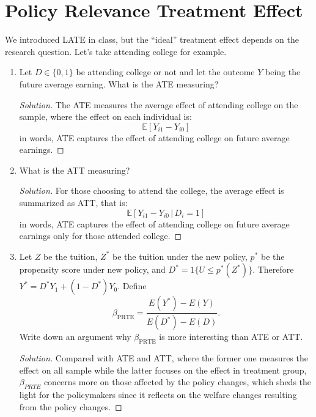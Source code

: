 \documentclass[11pt]{article}
\newenvironment{solution}{%
  \renewcommand\qedsymbol{$\blacksquare$}%
  \begin{mdframed}[backgroundcolor=gray!15]%
  \begin{proof}[Solution]}%
  {\end{proof}%
  \end{mdframed}}%
\newcommand{\ept}{\mathbb{E}}
\newcommand{\given}{\,|\,}
\begin{document}
    
    
\section{Policy Relevance Treatment Effect}

    We introduced LATE in class, but the ``ideal'' treatment effect depends on the research question. Let's take attending college for example.

    \begin{enumerate}

        \item Let $D \in \{0,1\}$ be attending college or not and let the outcome $Y$ being the future average earning. What is the ATE measuring?
        
            \begin{solution}
                The ATE measures the average effect of attending college on the sample, where the effect on each individual is:
                \[
                    \ept[Y_{i1} - Y_{i0}]
                \]
                in words, ATE captures the effect of attending college on future average earnings.
            \end{solution}
        
        \item What is the ATT measuring?
        
            \begin{solution}
                For those choosing to attend the college, the average effect is summarized as ATT, that is:
                \[
                    \ept[Y_{i1} - Y_{i0} \given D_i = 1]
                \]
                in words, ATE captures the effect of attending college on future average earnings only for those attended college.
            \end{solution}
        
        \item Let $Z$ be the tuition, $Z^*$ be the tuition under the new policy, $p^*$ be the propensity score under new policy, and $D^* = 1\{U \leq p^*(Z^*)\}$. Therefore $Y^* = D^*Y_1 + (1-D^*)Y_0$. Define
        \[\beta_{\text{PRTE}} = \frac{E(Y^*)-E(Y)}{E(D^*)-E(D)}.\]
        Write down an argument why $\beta_{\text{PRTE}}$ is more interesting than ATE or ATT.

            \begin{solution}
                Compared with ATE and ATT, where the former one measures the effect on all sample while the latter focuses on the effect in treatment group, $\beta_{PRTE}$ concerns more on those affected by the policy changes, which sheds the light for the policymakers since it reflects on the welfare changes resulting from the policy changes.
            \end{solution}
        

\end{enumerate}
\end{document}
